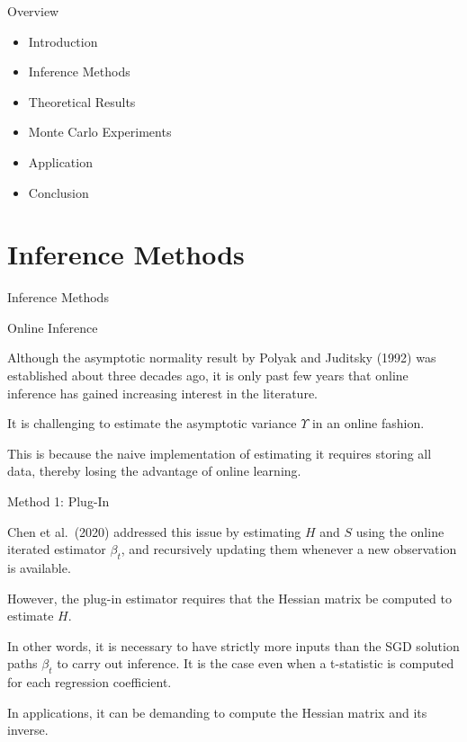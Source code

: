 \documentclass[beamer, t]{beamer}
\newcommand{\bit}{\begin{itemize}}
\newcommand{\eit}{\end{itemize}}
\begin{document}
\begin{frame}{Overview}
    \vfill
    \bit
        \item Introduction
        \item Inference Methods
        \item Theoretical Results
        \item Monte Carlo Experiments
        \item Application
        \item Conclusion
    \eit
    \vfill
\end{frame}




\section{Inference Methods}

\begin{frame}
   \vfill
   \centering
   \LARGE{Inference Methods}
   \vfill
\end{frame}

  

\begin{frame}{Online Inference}

Although the asymptotic normality result by Polyak and Juditsky (1992) was established about three decades ago, it is only past few years that online inference has gained increasing interest in the literature.
\bigskip

It is challenging to estimate the asymptotic variance $\Upsilon$  in an online fashion.
\bigskip


This is because
the naive implementation of estimating it requires storing all data, thereby losing the advantage of online learning.


\end{frame}



\begin{frame}{Method 1: Plug-In}


Chen et al.~(2020) addressed this issue by  estimating   $H$ and $S$ using the online iterated estimator $\beta_t$, and recursively updating   them   whenever a new observation  is available.

\bigskip 
However, the plug-in estimator requires that the Hessian matrix be computed to estimate $H$.

\bigskip
In other words, it is necessary to have strictly more inputs than  the SGD solution paths $\beta_t$ to carry out inference. It is the case even when a t-statistic is computed for each regression coefficient.

\bigskip
In applications, it can be demanding to compute the Hessian matrix and its inverse. 


\end{frame}
\end{document}
